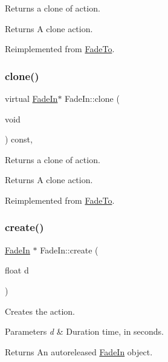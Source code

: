 Returns a clone of action.

\begin{DoxyReturn}{Returns}
A clone action. 
\end{DoxyReturn}


Reimplemented from \hyperlink{classFadeTo_a662485a4513a6e717db8df6c6065c284}{Fade\+To}.

\mbox{\label{classFadeIn_a11f3037a54e9cb96655fe74f5f007c06}} 
\subsubsection{\texorpdfstring{clone()}{clone()}\hspace{0.1cm}{\footnotesize\ttfamily [2/2]}}
{\footnotesize\ttfamily virtual \hyperlink{classFadeIn}{Fade\+In}$\ast$ Fade\+In\+::clone (\begin{DoxyParamCaption}\item[{void}]{ }\end{DoxyParamCaption}) const\hspace{0.3cm}{\ttfamily [override]}, {\ttfamily [virtual]}}

Returns a clone of action.

\begin{DoxyReturn}{Returns}
A clone action. 
\end{DoxyReturn}


Reimplemented from \hyperlink{classFadeTo_a662485a4513a6e717db8df6c6065c284}{Fade\+To}.

\mbox{\label{classFadeIn_a862eb13ebfe15dd806d03bd2f945be83}} 
\subsubsection{\texorpdfstring{create()}{create()}\hspace{0.1cm}{\footnotesize\ttfamily [1/2]}}
{\footnotesize\ttfamily \hyperlink{classFadeIn}{Fade\+In} $\ast$ Fade\+In\+::create (\begin{DoxyParamCaption}\item[{float}]{d }\end{DoxyParamCaption})\hspace{0.3cm}{\ttfamily [static]}}

Creates the action. 
\begin{DoxyParams}{Parameters}
{\em d} & Duration time, in seconds. \\
\hline
\end{DoxyParams}
\begin{DoxyReturn}{Returns}
An autoreleased \hyperlink{classFadeIn}{Fade\+In} object. 
\end{DoxyReturn}
\mbox{\label{classFadeIn_a1e154829fd7e5a1b3b328c9545ef6955}} 
